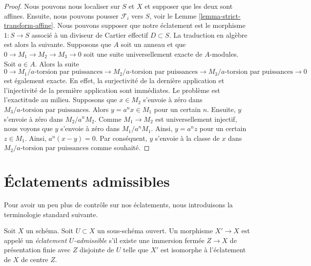 \begin{proof}
Nous pouvons nous localiser sur  $S$  et  $X$  et supposer que les
deux sont affines. Ensuite, nous pouvons pousser  $\mathcal{F}_i$  vers  $S$,
voir le Lemme  \ref{lemma-strict-transform-affine}. Nous pouvons supposer que notre éclatement est le
morphisme  $1 : S \to S$  associé à un diviseur de Cartier effectif  $D \subset S$.
La traduction en algèbre est alors la suivante. Supposons que  $A$  soit un
anneau et que  $0 \to M_1 \to M_2 \to M_3 \to 0$  soit une suite universellement exacte de
 $A$-modules. Soit  $a\in A$. Alors la suite
$$
0 \to
M_1/a\text{-torsion par puissances} \to
M_2/a\text{-torsion par puissances} \to
M_3/a\text{-torsion par puissances} \to 0
$$
est également exacte. En effet, la surjectivité de la dernière application et
l'injectivité de la première application sont immédiates. Le problème est
l'exactitude au milieu. Supposons que  $x \in M_2$  s'envoie à zéro dans
 $M_3/a\text{-torsion par puissances}$. Alors  $y = a^n x \in M_1$  pour un certain  $n$. Ensuite,  $y$ 
s'envoie à zéro dans  $M_2/a^nM_2$. Comme  $M_1 \to M_2$  est universellement
injectif, nous voyons que  $y$  s'envoie à zéro dans  $M_1/a^nM_1$. Ainsi,
 $y = a^n z$  pour un certain  $z \in M_1$. Ainsi,  $a^n(x - y) = 0$. Par conséquent,
 $y$  s'envoie à la classe de  $x$  dans  $M_2/a\text{-torsion par puissances}$  comme
souhaité.
\end{proof}







\section{Éclatements admissibles}
\label{section-admissible-blowups}

\noindent
Pour avoir un peu plus de contrôle sur nos éclatements, nous introduisons la
terminologie standard suivante.

\begin{definition}
\label{definition-admissible-blowup}
Soit  $X$  un schéma. Soit  $U \subset X$  un sous-schéma ouvert. Un morphisme
 $X' \to X$  est appelé un  {\it éclatement
$U$-admissible}  s'il existe une immersion fermée  $Z \to X$  de
présentation finie avec  $Z$  disjointe de  $U$  telle que
 $X'$  est isomorphe à l'éclatement de  $X$  de centre  $Z$.
\end{definition}

